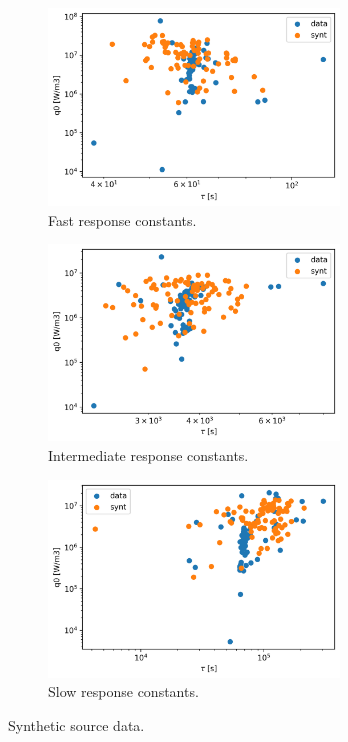 \begin{figure}[htbp!] %
  \centering
  \begin{subfigure}[b]{0.49\textwidth}
    \centering
    \includegraphics[width=0.85\textwidth]{figures/q0_vs_tau_cl2}
    \caption{Fast response constants.}
  \end{subfigure}
  \hfill
  \begin{subfigure}[b]{0.49\textwidth}
    \centering
    \includegraphics[width=0.85\textwidth]{figures/q0_vs_tau_cl3}
    \caption{Intermediate response constants.}
  \end{subfigure}
  \par
  \begin{subfigure}[b]{0.49\textwidth}
    \centering
    \includegraphics[width=0.85\textwidth]{figures/q0_vs_tau_cl1}
    \caption{Slow response constants.}
  \end{subfigure}
  \caption{Synthetic source data.}
  \label{fig:atr-source2}
\end{figure}

